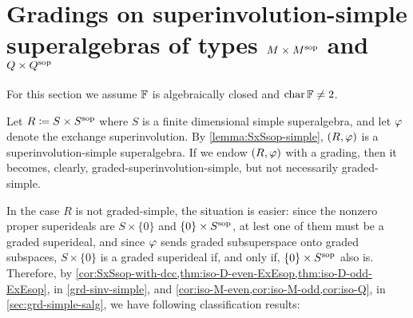 \section[Gradings on superinvolution-simple superalgebras of types  \texorpdfstring{$M\times M\sop$ and $Q\times Q\sop$}{MxMsop and QxQsop}]{Gradings on superinvolution-simple \\ superalgebras of types $M\times M\sop$ and $Q\times Q\sop$}\label{sec:model-O}

For this section we assume $\mathbb{F}$ is algebraically closed and $\operatorname{char} \mathbb{F} \neq 2$. 

Let $R \coloneqq S \times S^{\mathrm{sop}}$ where $S$ is a finite dimensional simple superalgebra, and let $\varphi$ denote the exchange superinvolution. 
By \cref{lemma:SxSsop-simple}, $(R, \varphi)$ is a superinvolution-simple superalgebra. 
If we endow $(R, \varphi)$ with a grading, then it becomes, clearly, graded-superinvolution-simple, but not necessarily graded-simple. 

In the case $R$ is not graded-simple, the situation is easier: since the nonzero proper superideals are $S \times \{ 0 \}$ and $\{ 0 \} \times S^{\mathrm{sop}}$, at lest one of them must be a graded superideal, and since $\varphi$ sends graded subsuperspace onto graded subspaces, $S \times \{ 0 \}$ is a graded superideal if, and only if, $\{ 0 \} \times S^{\mathrm{sop}}$ also is. 
Therefore, by \cref{cor:SxSsop-with-dcc,thm:iso-D-even-ExEsop,thm:iso-D-odd-ExEsop}, in \cref{grd-sinv-simple}, and \cref{cor:iso-M-even,cor:iso-M-odd,cor:iso-Q}, in \cref{sec:grd-simple-salg}, we have following classification results:

